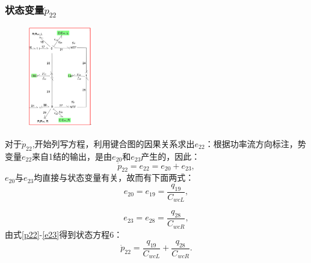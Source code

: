 \subsubsection{状态变量$\dot{ p}_{22} $}
\begin{figure}[H]
	\centering
	\includegraphics[width=0.25\textwidth]{fig/equation6.png}
	\caption{}\label{fig:equation6}
\end{figure}
对于$\dot{p} _ { 22 }$,开始列写方程，利用键合图的因果关系求出$e_{22}$：根据功率流方向标注，势变量$e_{22}$来自1结的输出，是由$e_{20}$和$e_{23}$产生的，因此：
\begin{equation}\label{p22}
\dot{ p }  _ { 22 } = e _ { 22 } = e _ { 20 } + e _ { 23 },
\end{equation}
$e_{20}$与$e_{23}$均直接与状态变量有关，故而有下面两式：
\begin{equation}
e _ { 20 } = e _ { 19 } = \frac { q _ { 19 } } { C _ { w cL }  },
\end{equation}

\begin{equation}\label{e23}
e _ { 23 } = e _ { 28 } = \frac { q _ { 28 } } { C _ { w c R }  },
\end{equation}
由式\ref{p22}-\ref{e23}得到状态方程6：
\begin{equation}
\dot{ p } _ { 22 } = \frac { q _ { 19 } } { C _ { w c L } } + \frac { q _ { 28 } } { C _ { w c R  } }.
\end{equation}
